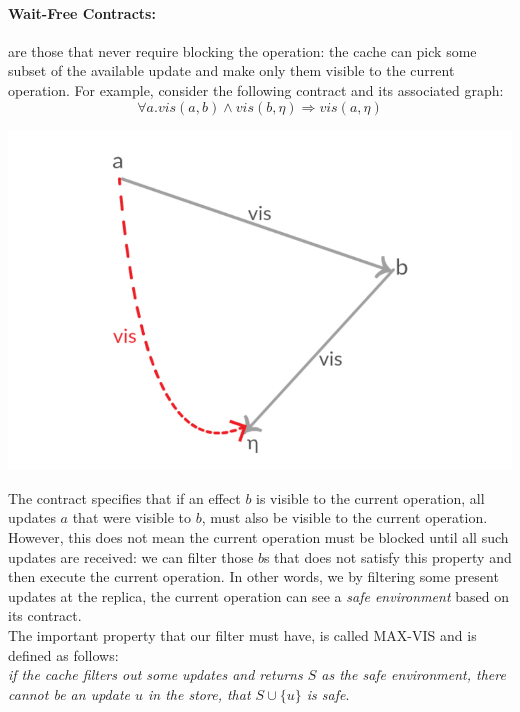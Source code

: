 \documentclass[runningheads]{llncs}
\begin{document}
\paragraph{Wait-Free Contracts:} are those that never require blocking the operation: the cache can pick some subset of the available update and make only them visible to the current operation. For example, consider the following contract and its associated graph:
\[\forall a. vis (a,b) \wedge vis (b,\eta) \Rightarrow vis (a,\eta)\]
\begin{center}
\includegraphics[scale=0.35]{c.pdf}
\end{center}
The contract specifies that if an effect $b$ is visible to the current operation,  all updates $a$ that were visible to $b$, must also be visible to the current operation. However, this does not mean the current operation must be blocked until all such updates are received: we can filter those $b$s that does not satisfy this property and then execute the current operation. In other words, we by filtering some present updates at the replica, the current operation can see a \emph {safe environment}  based on its contract. 
\\ The important property that our filter must have, is called MAX-VIS and is defined as follows: \\
\emph{if the cache filters out some updates and returns $S$ as the safe environment, there cannot be an update $u$ in the store, that $S\cup \{u\}$ is safe}.

\vspace{5mm}
\end{document}
